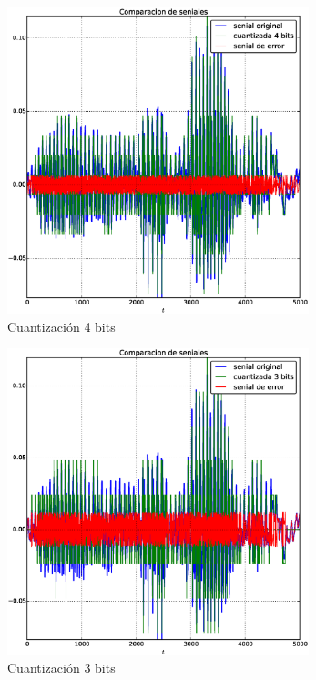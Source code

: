 \documentclass[10pt]{article}
\begin{document}
\begin{figure}[H]
   \centering
   \includegraphics[width=0.78\textwidth]{./Images/senialesv_voz_4_bits.eps}
   \caption{Cuantización 4 bits}\label{fig:qv:4}     
\end{figure}


\begin{figure}[H]
   \centering
   \includegraphics[width=0.78\textwidth]{./Images/senialesv_voz_3_bits.eps}
   \caption{Cuantización 3 bits}\label{fig:qv:3}     
\end{figure}
\end{document}
